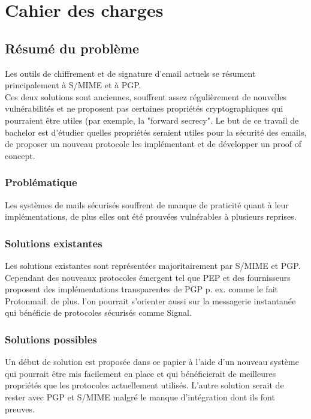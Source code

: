 \chapter{Cahier des charges}


\section*{Résumé du problème}
Les outils de chiffrement et de signature d'email actuels se résument principalement à S/MIME et à PGP. \\
Ces deux solutions sont anciennes, souffrent assez régulièrement de nouvelles vulnérabilités et ne proposent pas certaines propriétés cryptographiques qui pourraient être utiles (par exemple, la "forward secrecy". Le but de ce travail de bachelor est d'étudier quelles propriétés seraient utiles pour la sécurité des emails, de proposer un nouveau protocole les implémentant et de développer un proof of concept. 
\subsection*{Problématique}
Les systèmes de mails sécurisés souffrent de manque de praticité quant à leur implémentations, de plus elles ont été prouvées vulnérables à plusieurs reprises.
\subsection*{Solutions existantes}
Les solutions existantes sont représentées majoritairement par S/MIME et PGP. Cependant des nouveaux protocoles émergent tel que PEP et des fournisseurs proposent des implémentations transparentes de PGP p. ex. comme le fait Protonmail. de plus. l'on pourrait s'orienter aussi sur la messagerie instantanée qui bénéficie de protocoles sécurisés comme Signal.
\subsection*{Solutions possibles}
Un début de solution est proposée dans ce papier à l'aide d'un nouveau système qui pourrait être mis facilement en place et qui bénéficierait de meilleures propriétés que les protocoles actuellement utilisés. L'autre solution serait de rester avec PGP et S/MIME malgré le manque d'intégration dont ils font preuves.
